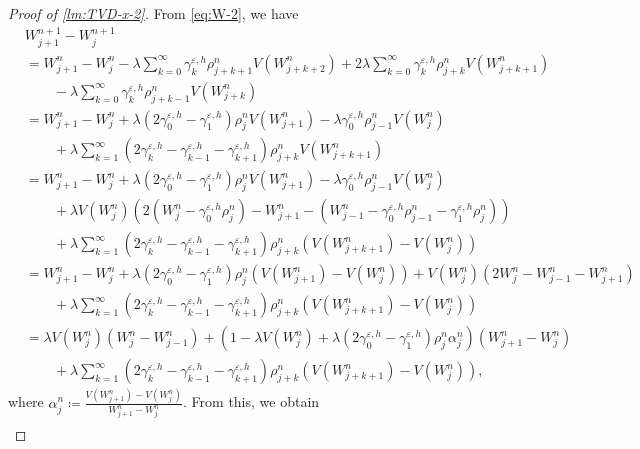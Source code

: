 \documentclass[10pt]{amsart}
\theoremstyle{plain}
\theoremstyle{definition}
\numberwithin{equation}{section}
\newcommand{\eps}{{\varepsilon}}
\begin{document}
\begin{proof}[Proof of \cref{lm:TVD-x-2}]
From \cref{eq:W-2}, we have 
\begin{align*}
    &W_{j+1}^{n+1} - W_j^{n+1} \\
    &= W_{j+1}^n - W_j^n - \lambda \sum_{k=0}^\infty \gamma_k^{\eps,h} \rho_{j+k+1}^n V(W_{j+k+2}^n) + 2 \lambda \sum_{k=0}^\infty \gamma_k^{\eps,h} \rho_{j+k}^n V(W_{j+k+1}^n) \\ & \qquad - \lambda \sum_{k=0}^\infty \gamma_k^{\eps,h} \rho_{j+k-1}^n V(W_{j+k}^n) \\
    &= W_{j+1}^n - W_j^n + \lambda \left(2\gamma_0^{\eps,h} - \gamma_1^{\eps,h}\right) \rho_j^n V(W_{j+1}^n) - \lambda \gamma_0^{\eps,h} \rho_{j-1}^n V(W_j^n) \\
    &\qquad + \lambda \sum_{k=1}^\infty \left(2\gamma_k^{\eps,h}-\gamma_{k-1}^{\eps,h}-\gamma_{k+1}^{\eps,h}\right) \rho_{j+k}^n V(W_{j+k+1}^n) \\
    &= W_{j+1}^n - W_j^n + \lambda \left(2\gamma_0^{\eps,h} - \gamma_1^{\eps,h}\right) \rho_j^n V(W_{j+1}^n) - \lambda \gamma_0^{\eps,h} \rho_{j-1}^n V(W_j^n) \\ & \qquad  + \lambda V(W_j^n) \left( 2\left(W_j^n-\gamma_0^{\eps,h} \rho_j^n\right) - W_{j+1}^n  - \left(W_{j-1}^n - \gamma_0^{\eps,h} \rho_{j-1}^n - \gamma_1^{\eps,h} \rho_j^n\right) \right) \\
    &\qquad + \lambda \sum_{k=1}^\infty \left(2\gamma_k^{\eps,h}-\gamma_{k-1}^{\eps,h}-\gamma_{k+1}^{\eps,h}\right) \rho_{j+k}^n \left(V(W_{j+k+1}^n) -V(W_j^n)\right) \\
    &= W_{j+1}^n - W_j^n + \lambda \left(2\gamma_0^{\eps,h} - \gamma_1^{\eps,h}\right) \rho_j^n \left(V(W_{j+1}^n) - V(W_j^n)\right) + V(W_j^n) (2W_j^n - W_{j-1}^n - W_{j+1}^n) \\
    &\qquad + \lambda \sum_{k=1}^\infty \left(2\gamma_k^{\eps,h}-\gamma_{k-1}^{\eps,h}-\gamma_{k+1}^{\eps,h}\right) \rho_{j+k}^n \left(V(W_{j+k+1}^n) -V(W_j^n)\right) \\
    &= \lambda V(W_j^n)(W_j^n - W_{j-1}^n) + \left( 1-\lambda V(W_j^n) + \lambda \left(2\gamma_0^{\eps,h}-\gamma_1^{\eps,h}\right) \rho_j^n\alpha_j^n \right) (W_{j+1}^n - W_j^n) \\
    &\qquad + \lambda \sum_{k=1}^\infty \left(2\gamma_k^{\eps,h}-\gamma_{k-1}^{\eps,h}-\gamma_{k+1}^{\eps,h}\right) \rho_{j+k}^n \left(V(W_{j+k+1}^n) -V(W_j^n)\right),
\end{align*}
where $\alpha_j^n\coloneqq\frac{V(W_{j+1}^n) - V(W_j^n)}{W_{j+1}^n - W_j^n}$. From this, we obtain
\begin{align}\label{eq:tv_tmp}

\end{align}
\end{proof}
\end{document}
